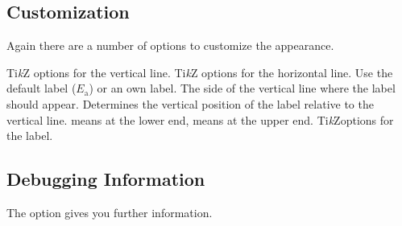 \documentclass[load-preamble+]{cnltx-doc}
\newcommand*\TikZ{Ti\textit{k}Z}
\begin{document}
\subsection{Customization}
Again there are a number of options to customize the appearance.
\begin{options}
  \Default{<->}
    \TikZ{} options for the vertical line.
    \TikZ{} options for the horizontal line.
    Use the default label ($E_{\mathrm{a}}$) or an own
    label.\label{key:showea_label}
    The side of the vertical line where the label should appear.
    Determines the vertical position of the label relative to the vertical line.
     means at the lower end,  means at the upper end.
  \Default
    \TikZ options for the label.
\end{options}

\begin{example}
  \begin{endiagram}
    \ShowEa[label,label-pos=.3]
  \end{endiagram}
\end{example}

\begin{example}
  \begin{endiagram}
    \ShowEa[
      from    = {(N1-1) to (N1-3)},
      connect = {draw=none},
      label   = endoth.]
    \ShowEa[
      from  = (N1-3) to (N1-5),
      label = exoth.,
      label-pos = .7]
    \ShowGain[label=exoth.] 
  \end{endiagram}
\end{example}

\subsection{Debugging Information}
The  option gives you further information.
\begin{example}
  \begin{endiagram}[debug]
    \ShowEa[max=all]
  \end{endiagram}
  \quad
  \begin{endiagram}[debug]
    \ShowEa[from={(0,1) to (6,3)}]
  \end{endiagram}
\end{example}
\end{document}
